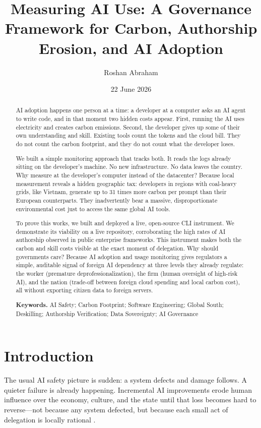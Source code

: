 \documentclass[11pt,a4paper]{article}
\title{Measuring AI Use: A Governance Framework for Carbon, Authorship Erosion, and AI Adoption}
\author[1]{Roshan Abraham}
\affil[1]{Independent Researcher and UX Design Engineer, Ho Chi Minh City, Vietnam}
\date{22 June 2026}
\begin{document}
\maketitle

\begin{abstract}
\noindent
AI adoption happens one person at a time: a developer at a computer asks an AI agent to write code, and in that moment two hidden costs appear. First, running the AI uses electricity and creates carbon emissions. Second, the developer gives up some of their own understanding and skill. Existing tools count the tokens and the cloud bill. They do not count the carbon footprint, and they do not count what the developer loses.

We built a simple monitoring approach that tracks both. It reads the logs already sitting on the developer's machine. No new infrastructure. No data leaves the country. Why measure at the developer's computer instead of the datacenter? Because local measurement reveals a hidden geographic tax: developers in regions with coal-heavy grids, like Vietnam, generate up to 31 times more carbon per prompt than their European counterparts. They inadvertently bear a massive, disproportionate environmental cost just to access the same global AI tools.

To prove this works, we built and deployed a live, open-source CLI instrument. We demonstrate its viability on a live repository, corroborating the high rates of AI authorship observed in public enterprise frameworks. This instrument makes both the carbon and skill costs visible at the exact moment of delegation. Why should governments care? Because AI adoption and usage monitoring gives regulators a simple, auditable signal of foreign AI dependency at three levels they already regulate: the worker (premature deprofessionalization), the firm (human oversight of high-risk AI), and the nation (trade-off between foreign cloud spending and local carbon cost), all without exporting citizen data to foreign servers.

\vspace{0.5em}
\noindent\textbf{Keywords.} AI Safety; Carbon Footprint; Software Engineering; Global South; Deskilling; Authorship Verification; Data Sovereignty; AI Governance
\end{abstract}

\section{Introduction}
The usual AI safety picture is sudden: a system defects and damage follows. A quieter failure is already happening. Incremental AI improvements erode human influence over the economy, culture, and the state until that loss becomes hard to reverse---not because any system defected, but because each small act of delegation is locally rational \cite{kulveit2025gradual}.
\end{document}
